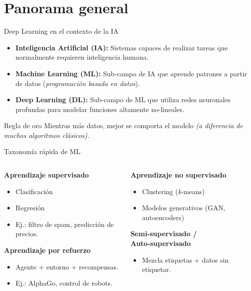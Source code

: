 \documentclass[12pt,spanish]{beamer}
\begin{document}
\section{Panorama general}
\begin{frame}{Deep Learning en el contexto de la IA}
  \begin{itemize}
    \item \textbf{Inteligencia Artificial (IA):} Sistemas capaces de realizar tareas que normalmente requieren inteligencia humana.
    \item \textbf{Machine Learning (ML):} Sub‑campo de IA que aprende patrones a partir de datos (\emph{programación basada en datos}).
    \item \textbf{Deep Learning (DL):} Sub‑campo de ML que utiliza redes neuronales profundas para modelar funciones altamente no‑lineales.
  \end{itemize}
  \begin{block}{Regla de oro}
    Mientras más datos, mejor se comporta el modelo \emph{(a diferencia de muchos algoritmos clásicos).}
  \end{block}
\end{frame}

\begin{frame}{Taxonomía rápida de ML}
  \begin{columns}[T]
    \begin{column}{0.5\textwidth}
      \textbf{Aprendizaje supervisado}
      \begin{itemize}
        \item Clasificación
        \item Regresión
        \item Ej.: filtro de spam, predicción de precios.
      \end{itemize}
      \vspace{1em}
      \textbf{Aprendizaje por refuerzo}
      \begin{itemize}
        \item Agente + entorno + recompensas.
        \item Ej.: AlphaGo, control de robots.
      \end{itemize}
    \end{column}
    \begin{column}{0.5\textwidth}
      \textbf{Aprendizaje no supervisado}
      \begin{itemize}
        \item Clustering (\emph{k}-means)
        \item Modelos generativos (GAN, autoencoders)
      \end{itemize}
      \vspace{1em}
      \textbf{Semi‑supervisado / Auto‑supervisado}
      \begin{itemize}
        \item Mezcla etiquetas + datos sin etiquetar.
      \end{itemize}
    \end{column}
  \end{columns}
\end{frame}
\end{document}
